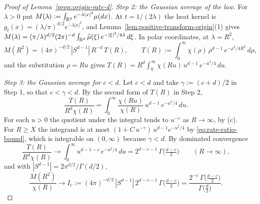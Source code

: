 \begin{proof}[Proof of Lemma~\ref{prop:origin-rate-d}]
\emph{Step 2: the Gaussian average of the law.} For $\lambda > 0$ put
$M(\lambda) := \int_{\mathbb{R}^d}e^{-\lambda|x|^2}\mu(dx)$. At $t = 1/(2\lambda)$ the heat kernel is
$g_t(x) = (\lambda/\pi)^{d/2}e^{-\lambda|x|^2}$, and Lemma~\ref{lem:positive-transform-origin}(1) gives
$M(\lambda) = (\pi/\lambda)^{d/2}(2\pi)^{-d}\int_{\mathbb{R}^d}\widehat\mu(\xi)\,e^{-|\xi|^2/4\lambda}\,d\xi$.
In polar coordinates, at $\lambda = R^2$,
\begin{equation}\label{eq:rate-gaussian-average}
  M(R^2) = (4\pi)^{-d/2}\,|S^{d-1}|\,R^{-d}\,T(R),
  \qquad
  T(R) := \int_0^\infty \chi(\rho)\,\rho^{d-1}\,e^{-\rho^2/4R^2}\,d\rho ,
\end{equation}
and the substitution $\rho = Ru$ gives
$T(R) = R^{d}\int_0^\infty \chi(Ru)\,u^{d-1}\,e^{-u^2/4}\,du$.

\emph{Step 3: the Gaussian average for $c < d$.} Let $c < d$ and take $\gamma := (c+d)/2$ in
Step 1, so that $c < \gamma < d$. By the second form of $T(R)$ in Step 2,
\[
  \frac{T(R)}{R^{d}\chi(R)} = \int_0^\infty \frac{\chi(Ru)}{\chi(R)}\,u^{d-1}\,e^{-u^2/4}\,du .
\]
For each $u > 0$ the quotient under the integral tends to $u^{-c}$ as $R \to \infty$, by (c). For
$R \ge X$ the integrand is at most $(1 + C\,u^{-\gamma})\,u^{d-1}e^{-u^2/4}$ by
\ref{eq:rate-ratio-bound}, which is integrable on $(0,\infty)$ because $\gamma < d$. By dominated
convergence
\[
  \frac{T(R)}{R^{d}\chi(R)} \to \int_0^\infty u^{d-1-c}\,e^{-u^2/4}\,du
   = 2^{d-c-1}\,\Gamma\bigl(\tfrac{d-c}{2}\bigr) \qquad (R \to \infty),
\]
and with $|S^{d-1}| = 2\pi^{d/2}/\Gamma(d/2)$,
\begin{equation}\label{eq:rate-abelian}
  \frac{M(R^2)}{\chi(R)} \to I_c := (4\pi)^{-d/2}\,|S^{d-1}|\,2^{d-c-1}\,\Gamma\bigl(\tfrac{d-c}{2}\bigr)
   = \frac{2^{-c}\,\Gamma\bigl(\tfrac{d-c}{2}\bigr)}{\Gamma\bigl(\tfrac d2\bigr)} .
\end{equation}


\end{proof}
